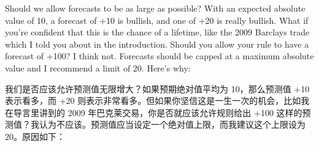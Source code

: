\bipairgap

\begin{englishblock} Should we allow forecasts to be as large as possible? With an expected absolute value of 10, a forecast of +10 is bullish, and one of +20 is really bullish. What if you're confident that this is the chance of a lifetime, like the 2009 Barclays trade which I told you about in the introduction. Should you allow your rule to have a forecast of +100? I think not. Forecasts should be capped at a maximum absolute value and I recommend a limit of 20. Here's why: \end{englishblock}

\begin{chineseblock}我们是否应该允许预测值无限增大？如果预期绝对值平均为 10，那么预测值 +10 表示看多，而 +20 则表示非常看多。但如果你坚信这是一生一次的机会，比如我在导言里讲到的 2009 年巴克莱交易，你是否就应该允许规则给出 +100 这样的预测值？我认为不应该。预测值应当设定一个绝对值上限，而我建议这个上限设为 20。原因如下：\end{chineseblock}

\bipairgap

